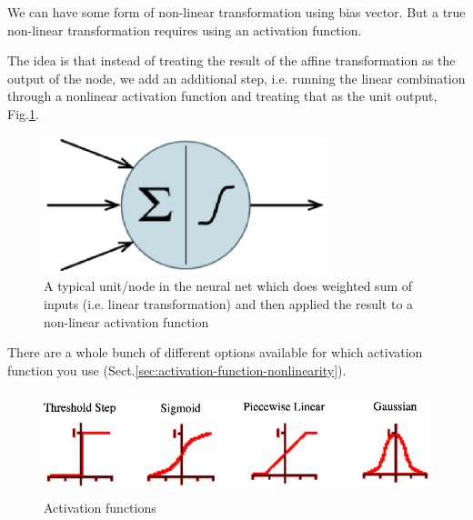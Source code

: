 We can have some form of non-linear transformation using bias vector. But a true
non-linear transformation requires using an activation function.

The idea is that instead of treating the result of the affine transformation as
the output of the node, we add an additional step, i.e. running the linear
combination through a nonlinear activation function and treating that as the
unit output, Fig.\ref{fig:node_neuralnet}.


\begin{figure}[hbt]
  \centerline{\includegraphics[height=4cm,
    angle=0]{./images/node_neuralnet.eps}}
\caption{A typical unit/node in the neural net which does weighted sum of inputs
(i.e. linear transformation) and then applied the result to a non-linear
activation function}
\label{fig:node_neuralnet}
\end{figure}


There are a whole bunch of different options available for which activation
function you use (Sect.\ref{sec:activation-function-nonlinearity}).



\begin{figure}[hbt]
  \centerline{\includegraphics[height=3cm,
    angle=0]{./images/activation_functions.eps}}
\caption{Activation functions}
\label{fig:activation_functions}
\end{figure}


